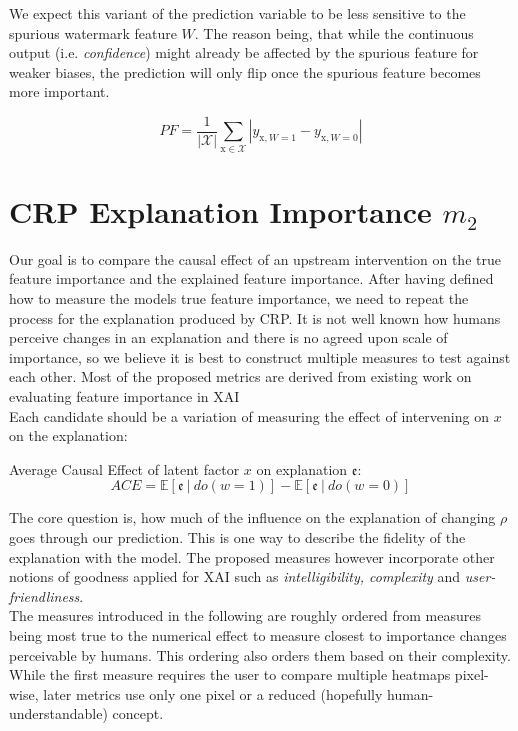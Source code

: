 We expect this variant of the prediction variable to be less sensitive to the spurious watermark feature $W$. The reason being, that while the continuous output (i.e. \textit{confidence}) might already be affected by the spurious feature for weaker biases, the prediction will only flip once the spurious feature becomes more important. 

\begin{equation}
\displaystyle 
PF =\frac{1}{|\mathcal{X}|} \sum_{\mathrm{x} \in \mathcal{X}} |y_{\mathrm{x}, W=1} - y_{\mathrm{x}, W=0} |
\end{equation}

\section{CRP Explanation Importance $m_2$}\label{section:measure}
Our goal is to compare the causal effect of an upstream intervention on the true feature importance and the explained feature importance. After having defined how to measure the models true feature importance, we need to repeat the process for the explanation produced by CRP. It is not well known how humans perceive changes in an explanation and there is no agreed upon scale of importance, so we believe it is best to construct multiple measures to test against each other. Most of the proposed metrics are derived from existing work on evaluating feature importance in XAI \cite{Arras2022} \\

Each candidate should be a variation of measuring the effect of intervening on $x$ on the explanation:
\begin{center}
Average Causal Effect of latent factor $x$ on explanation $\mathfrak{e}$: \\
\begin{equation}
\displaystyle ACE = \mathbb{E} [\mathfrak{e} \ | \ do(w=1) ] - \mathbb{E} [ \mathfrak{e} \ | \ do(w=0) ]
\end{equation}
\end{center}
The core question is, how much of the influence on the explanation of changing $\rho$ goes through our prediction. This is one way to describe the fidelity of the explanation with the model. The proposed measures however incorporate other notions of goodness applied for XAI such as \textit{intelligibility, complexity} and \textit{ user-friendliness}. \\

The measures introduced in the following are roughly ordered from measures being most true to the numerical effect to measure closest to importance changes perceivable by humans. This ordering also orders them based on their complexity. While the first measure requires the user to compare multiple heatmaps pixel-wise, later metrics use only one pixel or a reduced (hopefully human-understandable) concept. 

